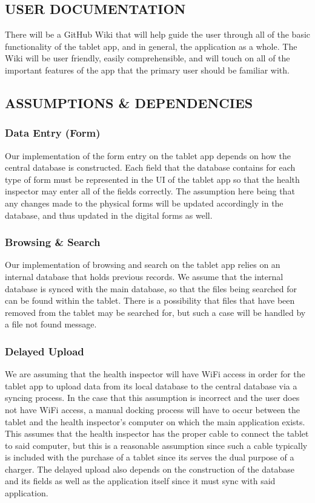 \documentclass[twoside,letterpaper]{article}
\begin{document}
\subsection[USER DOCUMENTATION]{\rmfamily\bfseries\color{black}
USER DOCUMENTATION}
{\rmfamily\color{black}
There will be a GitHub Wiki that will help guide the user through all of the basic functionality of the tablet app, and in general, the application as a whole. The Wiki will be user friendly, easily comprehensible, and will touch on all of the important features of the app that the primary user should be familiar with.}

\subsection[ASSUMPTIONS \& DEPENDENCIES]{\rmfamily\bfseries\color{black}
ASSUMPTIONS \& DEPENDENCIES}
\subsubsection{Data Entry (Form)}
Our implementation of the form entry on the tablet app depends on how the central database is constructed. Each field that the database contains for each type of form must be represented in the UI of the tablet app so that the health inspector may enter all of the fields correctly. The assumption here being that any changes made to the physical forms will be updated accordingly in the database, and thus updated in the digital forms as well. 
\subsubsection{Browsing \& Search}
Our implementation of browsing and search on the tablet app relies on an internal database that holds previous records. We assume that the internal database is synced with the main database, so that the files being searched for can be found within the tablet. There is a possibility that files that have been removed from the tablet may be searched for, but such a case will be handled by a file not found message. 
\subsubsection{Delayed Upload}
We are assuming that the health inspector will have WiFi access in order for the tablet app to upload data from its local database to the central database via a syncing process. In the case that this assumption is incorrect and the user does not have WiFi access, a manual docking process will have to occur between the tablet and the health inspector's computer on which the main application exists. This assumes that the health inspector has the proper cable to connect the tablet to said computer, but this is a reasonable assumption since such a cable typically is included with the purchase of a tablet since its serves the dual purpose of a charger. The delayed upload also depends on the construction of the database and its fields as well as the application itself since it must sync with said application.
\end{document}
